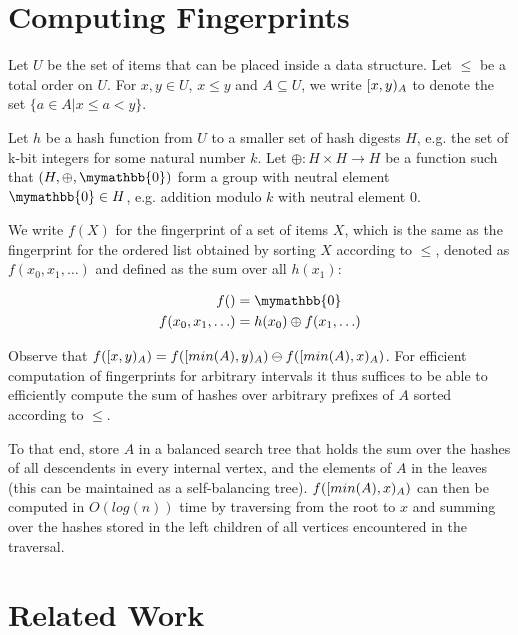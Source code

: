 \documentclass{article}
\begin{document}
\section{Computing Fingerprints}\label{computing-fingerprints}

Let $U$ be the set of items that can be placed inside a data structure. Let $\leq$ be a total order on $U$. For $x, y \in U$, $x \leq y$ and $A \subseteq U$, we write $[{x},{y})_{A}$ to denote the set $\{a \in A | x \leq a < y\}$.

Let $h$ be a hash function from $U$ to a smaller set of hash digests $H$, e.g. the set of k-bit integers for some natural number $k$.
Let $\oplus: H \times H \rightarrow H$ be a function such that $(H, \oplus, \mymathbb{0})$ form a group with neutral element $\mymathbb{0} \in H$, e.g. addition modulo $k$ with neutral element $0$.

We write $f(X)$ for the fingerprint of a set of items $X$, which is the same as the fingerprint for the ordered list obtained by sorting $X$ according to $\leq$, denoted as $f(x_0, x_1, \ldots)$ and defined as the sum over all $h(x_1)$:

\begin{align*}
f() &= \mymathbb{0}\\
f(x_0, x_1, \ldots) &= h(x_0) \oplus f(x_1, \ldots)\\
\end{align*}

Observe that $f([{x},{y})_{A}) = f([{min(A)},{y})_{A}) \ominus f([{min(A)},{x})_{A})$. For efficient computation of fingerprints for arbitrary intervals it thus suffices to be able to efficiently compute the sum of hashes over arbitrary prefixes of $A$ sorted according to $\leq$.

To that end, store $A$ in a balanced search tree that holds the sum over the hashes of all descendents in every internal vertex, and the elements of $A$ in the leaves (this can be maintained as a self-balancing tree). $f([{min(A)},{x})_{A})$ can then be computed in $O(log(n))$ time by traversing from the root to $x$ and summing over the hashes stored in the left children of all vertices encountered in the traversal.

\section{Related Work}\label{related-work}
\end{document}
